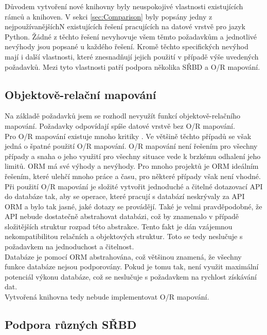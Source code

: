 \documentclass[ing,male,java,dept456]{diploma}						%
\begin{document}
Důvodem vytvoření nové knihovny byly neuspokojivé vlastnosti existujících rámců a knihoven. V sekci \ref{sec:Comparison} byly popsány jedny z nejpoužívanějšíchN existujících řešení pracujících na datové vrstvě pro jazyk Python. Žádné z těchto řešení nevyhovuje všem těmto požadavkům a jednotlivé nevýhody jsou popsané u každého řešení. Kromě těchto specifických nevýhod mají i další vlastnosti, které znesnadňují jejich použití v případě výše uvedených požadavků. Mezi tyto vlastnosti patří podpora několika SŘBD a O/R mapování. 

\subsection{Objektově-relační mapování}

Na základě požadavků jsem se rozhodl nevyužít funkcí objektově-relačního mapování. Požadavky odpovídají spíše datové vrstvě bez O/R mapování. \\
Pro O/R mapování existuje mnoho kritiky \cite{seldo, fowler-orm, dbprogrammer-orm, mehdi}. Ve většině těchto případů se však jedná o špatné použití O/R mapování. O/R mapování není řešením pro všechny případy a snaha o jeho využití pro všechny situace vede k brzkému odhalení jeho limitů. ORM má své výhody a nevýhody. Pro mnoho projektů je ORM ideálním řešením, které ulehčí mnoho práce a času, pro některé případy však není vhodné. \\
Při použití O/R mapování je složité vytvořit jednoduché a čitelné dotazovací API do databáze tak, aby se operace, které pracují s databází neskrývaly za API ORM a bylo tak jasné, jaké dotazy se provádějí. Také je velmi pravděpodobné, že API nebude dostatečně abstrahovat databázi, což by znamenalo v případě složitějších struktur rozpad této abstrakce. Tento fakt je dán vzájemnou nekompatibilitou relačních a objektových struktur. Toto se tedy neslučuje s požadavkem na jednoduchost a čitelnost. \\
Databáze je pomocí ORM abstrahována, což většinou znamená, že všechny funkce databáze nejsou podporovány. Pokud je tomu tak, není využit maximální potenciál výkonu databáze, což se neslučuje s požadavkem na rychlost získávání dat. \\
Vytvořená knihovna tedy nebude implementovat O/R mapování. 

\subsection{Podpora různých SŘBD}
\end{document}
